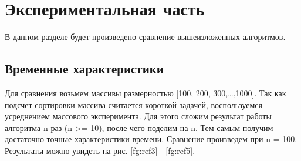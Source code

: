 \chapter{Экспериментальная часть}

В данном разделе будет произведено сравнение вышеизложенных алгоритмов.

\section{Временные характеристики}

Для сравнения возьмем массивы размерностью [100, 200, 300,\dots,1000]. 
Так как подсчет сортировки массива считается короткой задачей, воспользуемся усреднением массового эксперимента. 
Для этого сложим результат работы алгоритма n раз (n >= 10), после чего поделим на n. 
Тем самым получим достаточно точные характеристики времени. 
Сравнение произведем при n = 100.
Результаты можно увидеть на рис. \ref{fg:ref3} - \ref{fg:ref5}. 

\begin{figure}[ht!]
\end{figure}

